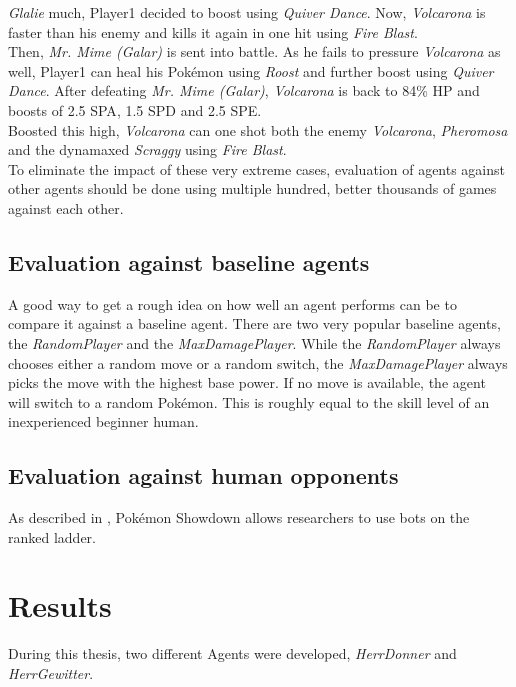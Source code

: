\textit{Glalie} much, Player1 decided to boost using \textit{Quiver Dance}. Now, \textit{Volcarona}
is faster than his enemy and kills it again in one hit using \textit{Fire Blast}. \\
Then, \textit{Mr. Mime (Galar)} is sent into battle. As he fails to pressure \textit{Volcarona} as well,
Player1 can heal his Pokémon using \textit{Roost} and further boost using \textit{Quiver Dance}. After
defeating \textit{Mr. Mime (Galar)}, \textit{Volcarona} is back to 84\% HP and boosts of 2.5 \ac{SPA},
1.5 \ac{SPD} and 2.5 \ac{SPE}. \\
Boosted this high, \textit{Volcarona} can one shot both the enemy \textit{Volcarona},
\textit{Pheromosa} and the dynamaxed \textit{Scraggy} using \textit{Fire Blast}. \\
To eliminate the impact of these very extreme cases, evaluation of agents against other agents 
should be done using multiple hundred, better thousands of games against each other.

\subsection{Evaluation against baseline agents}
\label{sec:eval-challenges-baseline}
A good way to get a rough idea on how well an agent performs can be to compare it against a baseline agent.
There are two very popular baseline agents, the \textit{RandomPlayer} and the \textit{MaxDamagePlayer}.
While the \textit{RandomPlayer} always chooses either a random move or a random switch, the \textit{MaxDamagePlayer}
always picks the move with the highest base power. If no move is available, the agent will switch to a random 
Pokémon. This is roughly equal to the skill level of an inexperienced beginner human. 

\subsection{Evaluation against human opponents}
As described in , Pokémon Showdown allows researchers to use bots on the
ranked ladder. 

\section{Results}
During this thesis, two different Agents were developed, \textit{HerrDonner} and \textit{HerrGewitter}.

